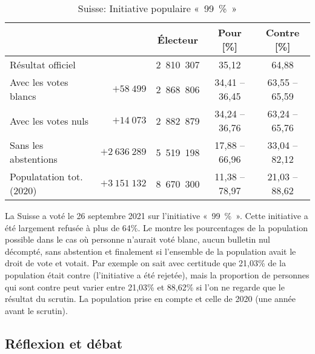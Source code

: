 \documentclass[../report]{subfiles}
\begin{document}
  \begin{table}[h]
    \caption{Suisse: Initiative populaire «~99~\%~»}%
    \label{tab:votation:99pourcent}%
    \begin{center}
      \begin{tabular}{lrccc}
        \hline
        & & Électeur & Pour [\%] & Contre [\%] \\
        \hline
        \hline
        Résultat officiel        &              & 2~810~307 & 35,12          & 64,88          \\
        Avec les votes blancs    & $+58~499$    & 2~868~806 & 34,41 -- 36,45 & 63,55 -- 65,59 \\
        Avec les votes nuls      & $+14~073$    & 2~882~879 & 34,24 -- 36,76 & 63,24 -- 65,76 \\
        Sans les abstentions     & $+2~636~289$ & 5~519~198 & 17,88 -- 66,96 & 33,04 -- 82,12 \\
        Populatation tot. (2020) & $+3~151~132$ & 8~670~300 & 11,38 -- 78,97 & 21,03 -- 88,62 \\
        \hline
      \end{tabular}
    \end{center}
  \end{table}

  La Suisse a voté le 26 septembre 2021 sur l'initiative «~99~\%~».
  Cette initiative a été largement refusée à plus de 64\%.
  Le  montre les pourcentages de la population possible dans le 
  cas où personne n'aurait voté blanc, aucun bulletin nul décompté, sans abstention et 
  finalement si l'ensemble de la population avait le droit de vote et votait.
  Par exemple on sait avec certitude que 21,03\% de la population était contre 
  (l'initiative a été rejetée), mais la proportion de personnes qui sont contre peut varier entre 
  21,03\% et 88,62\% si l'on ne regarde que le résultat du scrutin.
  La population prise en compte et celle de 2020 (une année avant le scrutin).

  \subsection{Réflexion et débat}
\end{document}
